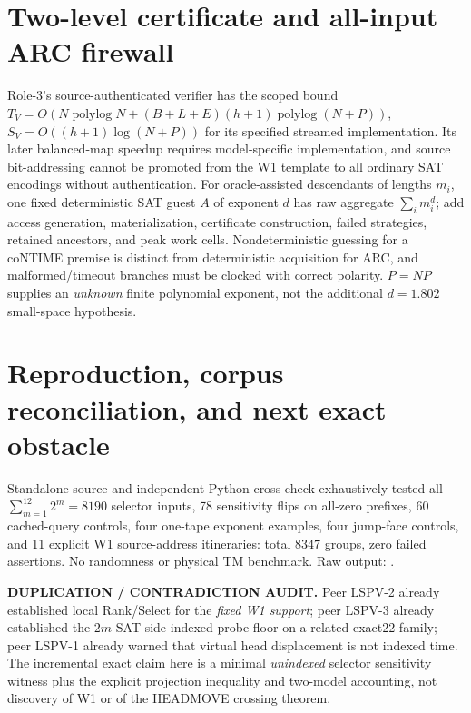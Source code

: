 \documentclass[11pt]{article}
\begin{document}
\section{Two-level certificate and all-input ARC firewall}
Role-3's source-authenticated verifier has the scoped bound
\(T_V=O(N\operatorname{polylog}N+(B+L+E)(h+1)
\operatorname{polylog}(N+P))\),
\(S_V=O((h+1)\log(N+P))\) for its specified streamed
implementation. Its later balanced-map speedup requires model-specific
implementation, and source bit-addressing cannot be promoted from
the W1 template to all ordinary SAT encodings without authentication.
For oracle-assisted descendants of lengths \(m_i\), one fixed
deterministic SAT guest \(A\) of exponent \(d\) has raw aggregate
\(\sum_i m_i^d\); add access generation, materialization,
certificate construction, failed strategies, retained ancestors,
and peak work cells. Nondeterministic guessing for a coNTIME
premise is distinct from deterministic acquisition for ARC,
and malformed/timeout branches must be clocked with correct polarity.
\(P=NP\) supplies an \emph{unknown} finite polynomial exponent,
not the additional \(d=1.802\) small-space hypothesis.

\section{Reproduction, corpus reconciliation, and next exact obstacle}
Standalone source
and independent Python cross-check exhaustively tested all
\(\sum_{m=1}^{12}2^m=8190\) selector inputs, 78 sensitivity
flips on all-zero prefixes, 60 cached-query controls, four
one-tape exponent examples, four jump-face controls, and 11
explicit W1 source-address itineraries: total \(8347\) groups,
zero failed assertions. No randomness or physical TM benchmark.
Raw output:
.

\noindent\textbf{DUPLICATION / CONTRADICTION AUDIT.}
Peer LSPV-2 already established local Rank/Select for the
\emph{fixed W1 support}; peer LSPV-3 already established the
\(2m\) SAT-side indexed-probe floor on a related exact22 family;
peer LSPV-1 already warned that virtual head displacement is not
indexed time. The incremental exact claim here is a minimal
\emph{unindexed} selector sensitivity witness plus the explicit
projection inequality and two-model accounting, not discovery
of W1 or of the HEADMOVE crossing theorem.
\end{document}
